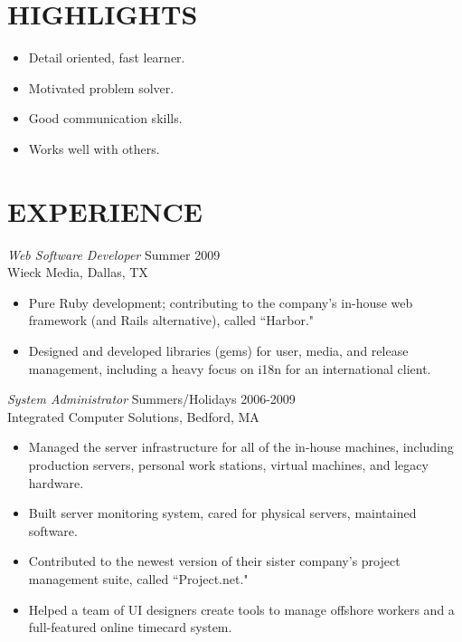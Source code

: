 \documentclass[line,margin]{res}
\begin{document}
 
\address{\,\,\, dana.merrick@gmail.com}
\address{Acton, MA -- 978.206.1331}
 
\begin{resume}

\section{HIGHLIGHTS}
	\begin{itemize}  \itemsep -2pt %
		\item Detail oriented, fast learner.
		\item Motivated problem solver.
		\item Good communication skills.
		\item Works well with others.
	\end{itemize}

\section{EXPERIENCE}
	{\sl Web Software Developer} \hfill Summer 2009 \\
	Wieck Media, 
	Dallas, TX
	\begin{itemize}  \itemsep -2pt %
		\item Pure Ruby development; contributing to the company's in-house web framework (and Rails alternative), called ``Harbor."
		\item Designed and developed libraries (gems) for user, media, and release management, including a heavy focus on i18n for an international client.
	\end{itemize}
 
	{\sl System Administrator} \hfill            Summers/Holidays 2006-2009 \\
	Integrated Computer Solutions,
	Bedford, MA
	\begin{itemize}  \itemsep -2pt %
		\item Managed the server infrastructure for all of the in-house machines, including production servers, personal work stations, virtual machines, and legacy hardware.
		\item Built server monitoring system, cared for physical servers, maintained software.
		\item Contributed to the newest version of their sister company's project management suite, called ``Project.net."
		\item Helped a team of UI designers create tools to manage offshore workers and a full-featured online timecard system.
	\end{itemize} 


\end{resume}
\end{document}
